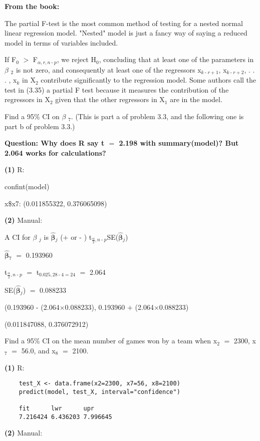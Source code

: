 \documentclass{article}
\newcommand{\mt}[1]{\ensuremath{#1}}
\newcommand{\bpth}[1]{\textbf{(#1)}}
\newcommand{\afa}{\mt{\alpha} }
\newcommand{\bta}{\mt{\beta} }
\newcommand{\ps}{\mt{\operatorname{+}} }
\newcommand{\ms}{\mt{\operatorname{-}} }
\newcommand{\gr}{\mt{\operatorname{>}} }
\newcommand{\eql}{ \mt{\operatorname{=}} }
\newcommand{\uw}[2]{#1\mt{_{#2}}}
\newcommand{\frc}[2]{\mt{\frac{#1}{#2}}}
\newcommand{\bh}[1]{\mathbf{\hat{\text{$#1$}}}}
\newcommand{\bth}{\mt{\bh{\beta}}}
\begin{document}
{	\textbf{From the book:} 
	
	The partial F-test is the most common method of testing for a nested normal linear regression model. "Nested" model is just a fancy way of saying a reduced model in terms of variables included.
	
	If \uw{F}{0} \gr \uw{F}{\afa, r, n \ms p}, we reject \uw{H}{0}, concluding that at least one of the parameters in \uw{\bta}{2} is not zero, and consequently at least one of the regressors \uw{x}{k \ms r \ps 1}, \uw{x}{k \ms r \ps 2}, . . . , \uw{x}{k} in \uw{X}{2} contribute significantly to the regression model. Some authors call the test in (3.35) a partial F test because it measures the contribution of the regressors in \uw{X}{2} given that the other regressors in \uw{X}{1} are in the model.		
	
\item Find a 95\% CI on \uw{\bta}{7}. (This is part a of problem 3.3, and the following one is part b of problem 3.3.)
	
	\textbf{Question: Why does R say t \eql 2.198 with summary(model)? But 2.064 works for calculations?}
	
	\bpth{1} R:
	
	confint(model)
	
	x\$x7: (0.011855322, 0.376065098)
	
	\bpth{2} Manual:
	
	A CI for \uw{\bta}{j} is \uw{\bth}{j} (\ps or \ms) \uw{t}{\frc{\afa}{2}, n \ms p}SE(\uw{\bth}{j})
	
	\uw{\bth}{7} \eql 0.193960
	
	\uw{t}{\frc{\afa}{2}, n \ms p} \eql \uw{t}{0.025, 28 \ms 4 \eql 24} \eql 2.064
	
	SE(\uw{\bth}{j}) \eql 0.088233
	
	(0.193960 \ms (2.064$\times$0.088233), 0.193960 \ps (2.064$\times$0.088233)
	
	(0.011847088, 0.376072912)
	
\item Find a 95\% CI on the mean number of games won by a team when \uw{x}{2} \eql 2300, \uw{x}{7} \eql 56.0, and \uw{x}{8} \eql 2100.
	
	
	\bpth{1} R:
\begin{verbatim}
	test_X <- data.frame(x2=2300, x7=56, x8=2100)
	predict(model, test_X, interval="confidence")
	
	fit      lwr      upr
	7.216424 6.436203 7.996645
\end{verbatim}
	\bpth{2} Manual:
	
}
\end{document}
